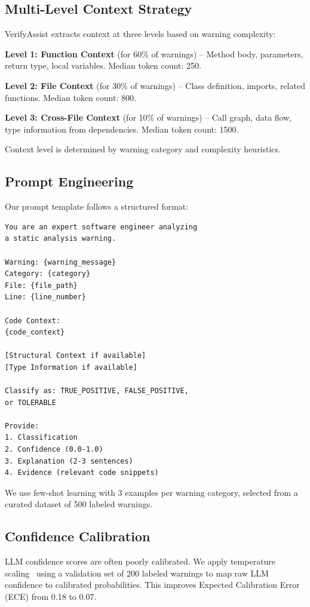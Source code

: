 \documentclass[conference]{IEEEtran}
\begin{document}
\subsection{Multi-Level Context Strategy}

VerifyAssist extracts context at three levels based on warning complexity:

\textbf{Level 1: Function Context} (for 60\% of warnings) -- Method body, parameters, return type, local variables. Median token count: 250.

\textbf{Level 2: File Context} (for 30\% of warnings) -- Class definition, imports, related functions. Median token count: 800.

\textbf{Level 3: Cross-File Context} (for 10\% of warnings) -- Call graph, data flow, type information from dependencies. Median token count: 1500.

Context level is determined by warning category and complexity heuristics.

\subsection{Prompt Engineering}

Our prompt template follows a structured format:

\begin{verbatim}
You are an expert software engineer analyzing 
a static analysis warning.

Warning: {warning_message}
Category: {category}
File: {file_path}
Line: {line_number}

Code Context:
{code_context}

[Structural Context if available]
[Type Information if available]

Classify as: TRUE_POSITIVE, FALSE_POSITIVE, 
or TOLERABLE

Provide:
1. Classification
2. Confidence (0.0-1.0)
3. Explanation (2-3 sentences)
4. Evidence (relevant code snippets)
\end{verbatim}

We use few-shot learning with 3 examples per warning category, selected from a curated dataset of 500 labeled warnings.

\subsection{Confidence Calibration}

LLM confidence scores are often poorly calibrated. We apply temperature scaling~\cite{guo2017calibration} using a validation set of 200 labeled warnings to map raw LLM confidence to calibrated probabilities. This improves Expected Calibration Error (ECE) from 0.18 to 0.07.
\end{document}
